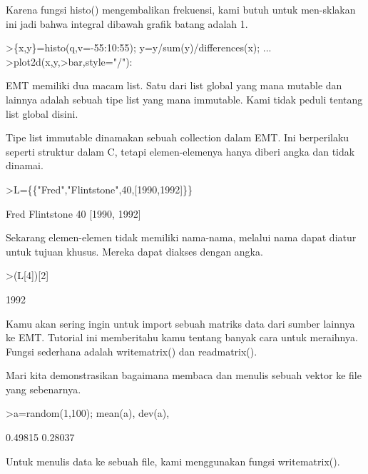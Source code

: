 \documentclass[a4paper,10pt]{article}
\begin{document}
\begin{eulernotebook}
\begin{eulercomment}
\begin{eulercomment}
\begin{eulercomment}
\begin{eulercomment}
\begin{eulercomment}
Karena fungsi histo() mengembalikan frekuensi, kami butuh untuk
men-sklakan ini jadi bahwa integral dibawah grafik batang adalah 1.
\end{eulercomment}
\begin{eulerprompt}
>\{x,y\}=histo(q,v=-55:10:55); y=y/sum(y)/differences(x); ...
>plot2d(x,y,>bar,style="/"):
\end{eulerprompt}
\begin{eulercomment}
EMT memiliki dua macam list. Satu dari list global yang mana mutable
dan lainnya adalah sebuah tipe list yang mana immutable. Kami tidak
peduli tentang list global disini.

Tipe list immutable dinamakan sebuah collection dalam EMT. Ini
berperilaku seperti struktur dalam C, tetapi elemen-elemenya hanya
diberi angka dan tidak dinamai.
\end{eulercomment}
\begin{eulerprompt}
>L=\{\{"Fred","Flintstone",40,[1990,1992]\}\}
\end{eulerprompt}
\begin{euleroutput}
  Fred
  Flintstone
  40
  [1990,  1992]
\end{euleroutput}
\begin{eulercomment}
Sekarang elemen-elemen tidak memiliki nama-nama, melalui nama dapat
diatur untuk tujuan khusus. Mereka dapat diakses dengan angka.
\end{eulercomment}
\begin{eulerprompt}
>(L[4])[2]
\end{eulerprompt}
\begin{euleroutput}
  1992
\end{euleroutput}
\begin{eulercomment}
\begin{eulercomment}
\begin{eulercomment}
Kamu akan sering ingin untuk import sebuah matriks data dari sumber
lainnya ke EMT. Tutorial ini memberitahu kamu tentang banyak cara
untuk meraihnya. Fungsi sederhana adalah writematrix() dan
readmatrix().

Mari kita demonstrasikan bagaimana membaca dan menulis sebuah vektor
ke file yang sebenarnya.
\end{eulercomment}
\begin{eulerprompt}
>a=random(1,100); mean(a), dev(a),
\end{eulerprompt}
\begin{euleroutput}
  0.49815
  0.28037
\end{euleroutput}
\begin{eulercomment}
Untuk menulis data ke sebuah file, kami menggunakan fungsi
writematrix().


\end{eulercomment}
\end{eulercomment}
\end{eulercomment}
\end{eulercomment}
\end{eulercomment}
\end{eulercomment}
\end{eulercomment}
\end{eulernotebook}
\end{document}
